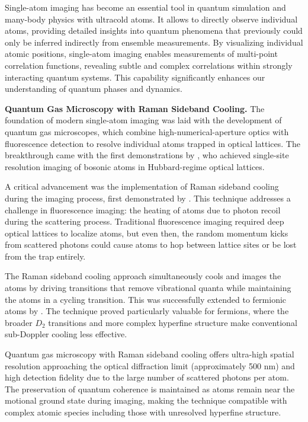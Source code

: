 





Single-atom imaging has become an essential tool in quantum simulation and many-body physics with ultracold atoms. It allows to directly observe individual atoms, providing detailed insights into quantum phenomena that previously could only be inferred indirectly from ensemble measurements. By visualizing individual atomic positions, single-atom imaging enables measurements of multi-point correlation functions, revealing subtle and complex correlations within strongly interacting quantum systems. This capability significantly enhances our understanding of quantum phases and dynamics.

\textbf{Quantum Gas Microscopy with Raman Sideband Cooling.} The foundation of modern single-atom imaging was laid with the development of quantum gas microscopes, which combine high-numerical-aperture optics with fluorescence detection to resolve individual atoms trapped in optical lattices. The breakthrough came with the first demonstrations by \cite{bakr_quantum_2009, sherson_single-atom-resolved_2010}, who achieved single-site resolution imaging of bosonic atoms in Hubbard-regime optical lattices.

A critical advancement was the implementation of Raman sideband cooling during the imaging process, first demonstrated by \cite{lester_raman_2014}. This technique addresses a challenge in fluorescence imaging: the heating of atoms due to photon recoil during the scattering process. Traditional fluorescence imaging required deep optical lattices to localize atoms, but even then, the random momentum kicks from scattered photons could cause atoms to hop between lattice sites or be lost from the trap entirely.

The Raman sideband cooling approach simultaneously cools and images the atoms by driving transitions that remove vibrational quanta while maintaining the atoms in a cycling transition. This was successfully extended to fermionic atoms by \cite{cheuk_quantum-gas_2015}.
The technique proved particularly valuable for fermions, where the broader $D_2$ transitions and more complex hyperfine structure make conventional sub-Doppler cooling less effective.

Quantum gas microscopy with Raman sideband cooling offers ultra-high spatial resolution approaching the optical diffraction limit (approximately 500 nm) and high detection fidelity
due to the large number of scattered photons per atom. The preservation of quantum coherence is maintained as atoms remain near the motional ground state during imaging, making the technique compatible with complex atomic species including those with unresolved hyperfine structure.

